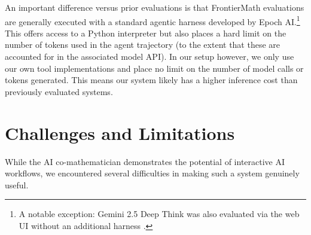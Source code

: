\documentclass[11pt, a4paper, copyright, gdm]{google}
\begin{document}
An important difference versus prior evaluations is that FrontierMath evaluations are generally executed with a standard agentic harness developed by Epoch AI.\footnote{A notable exception: Gemini 2.5 Deep Think was also evaluated via the web UI without an additional harness \citep{epoch2025evaluatingdeepthink}.} This offers access to a Python interpreter but also places a hard limit on the number of tokens used in the agent trajectory (to the extent that these are accounted for in the associated model API). In our setup however, we only use our own tool implementations and place no limit on the number of model calls or tokens generated. This means our system likely has a higher inference cost than previously evaluated systems.

\section{Challenges and Limitations}
\label{sec:limitations}

While the AI co-mathematician demonstrates the potential of interactive AI workflows, we encountered several difficulties in making such a system genuinely useful.
\end{document}
